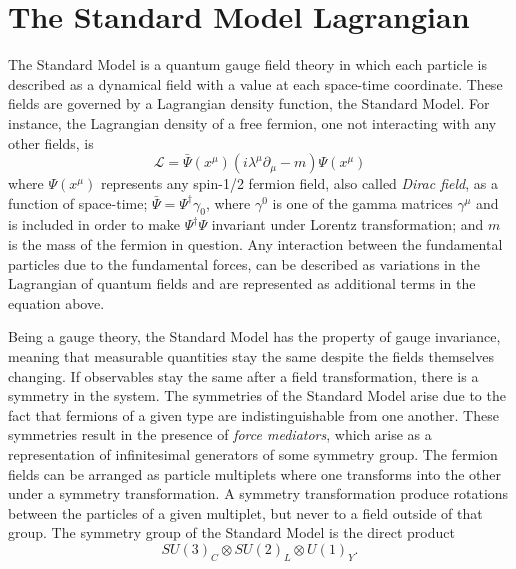 \section{The Standard Model Lagrangian}
\label{sec:theory:gauge}
The Standard Model is a quantum gauge field theory in which each particle is described as a dynamical field with a value at each space-time coordinate. These fields are governed by a Lagrangian density function, the Standard Model. For instance, the Lagrangian density of a free fermion, one not interacting with any other fields, is
\begin{equation}
  \label{eq:theory:freeLag}
  \mathcal{L} = \bar{\Psi}(x^{\mu})(i\lambda^{\mu}\partial_{\mu}-m)\Psi(x^{\mu})
\end{equation}
where $\Psi(x^{\mu})$ represents any spin-1/2 fermion field, also called \emph{Dirac field}, as a function of space-time; $\bar{\Psi}=\Psi^{\dagger}\gamma_0$, where $\gamma^0$ is one of the gamma matrices $\gamma^{\mu}$ and is included in order to make $\Psi^{\dagger}\Psi$ invariant under Lorentz transformation; and $m$ is the mass of the fermion in question. Any interaction between the fundamental particles due to the fundamental forces, can be described as variations in the Lagrangian of quantum fields and are represented as additional terms in the equation above.\par
Being a gauge theory, the Standard Model has the property of gauge invariance, meaning that measurable quantities stay the same despite the fields themselves changing. If observables stay the same after a field transformation, there is a symmetry in the system. The symmetries of the Standard Model arise due to the fact that fermions of a given type are indistinguishable from one another. These symmetries result in the presence of \emph{force mediators}, which arise as a representation of infinitesimal generators of some symmetry group.
The fermion fields can be arranged as particle multiplets where one transforms into the other under a symmetry transformation. A symmetry transformation produce rotations between the particles of a given multiplet, but never to a field outside of that group. The symmetry group of the Standard Model is the direct product
\begin{equation}
  SU(3)_C \otimes SU (2)_L \otimes U(1)_Y.
\end{equation}
